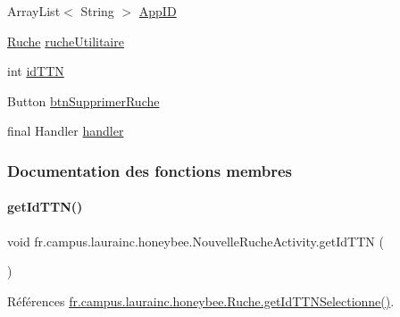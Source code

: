 \begin{DoxyCompactItemize}
\item 
Array\+List$<$ String $>$ \hyperlink{classfr_1_1campus_1_1laurainc_1_1honeybee_1_1_nouvelle_ruche_activity_a0ff20f2b7c524901d60c78d078999d85}{App\+ID}
\item 
\hyperlink{classfr_1_1campus_1_1laurainc_1_1honeybee_1_1_ruche}{Ruche} \hyperlink{classfr_1_1campus_1_1laurainc_1_1honeybee_1_1_nouvelle_ruche_activity_adad53c25187f84fd37af3d2de167529e}{ruche\+Utilitaire}
\item 
int \hyperlink{classfr_1_1campus_1_1laurainc_1_1honeybee_1_1_nouvelle_ruche_activity_a0e39429b741638b151aec8960b76b0e1}{id\+T\+TN}
\item 
Button \hyperlink{classfr_1_1campus_1_1laurainc_1_1honeybee_1_1_nouvelle_ruche_activity_abd504e41c6cb223e18a106bb1bb62a7d}{btn\+Supprimer\+Ruche}
\item 
final Handler \hyperlink{classfr_1_1campus_1_1laurainc_1_1honeybee_1_1_nouvelle_ruche_activity_a71c7cb93b67cfe6c419c3c6f8504bbc0}{handler}
\end{DoxyCompactItemize}


\subsubsection{Documentation des fonctions membres}
\mbox{\label{classfr_1_1campus_1_1laurainc_1_1honeybee_1_1_nouvelle_ruche_activity_a83e03af4d233629129a31cd78f762551}} 
\paragraph{\texorpdfstring{get\+Id\+T\+T\+N()}{getIdTTN()}}
{\footnotesize\ttfamily void fr.\+campus.\+laurainc.\+honeybee.\+Nouvelle\+Ruche\+Activity.\+get\+Id\+T\+TN (\begin{DoxyParamCaption}{ }\end{DoxyParamCaption})\hspace{0.3cm}{\ttfamily [private]}}



Références \hyperlink{classfr_1_1campus_1_1laurainc_1_1honeybee_1_1_ruche_a8c4c0db39c42733517035c4211e0ff95}{fr.\+campus.\+laurainc.\+honeybee.\+Ruche.\+get\+Id\+T\+T\+N\+Selectionne()}.


